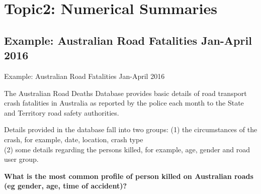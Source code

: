 \documentclass[t,xcolor=pdftex,dvipsnames,table]{beamer}\usepackage[]{graphicx}\usepackage[]{color}
\begin{document}
\section[2]{Topic2: Numerical Summaries}

\subsection[]{Example: Australian Road Fatalities Jan-April 2016}

\begin{frame}[fragile]{Example: Australian Road Fatalities Jan-April 2016}

The Australian Road Deaths Database provides basic details of road transport crash fatalities in Australia as reported by the police each month to the State and Territory road safety authorities.

\vspace{.5cm}
Details provided in the database fall into two groups:
(1) the circumstances of the crash, for example, date, location, crash type \\
(2) some details regarding the persons killed, for example, age, gender and road user group.

\vspace{.5cm}
{\bf What is the most common profile of person killed on Australian roads (eg gender, age, time of accident)?}

\vspace{.5cm}
\href{https://bitre.gov.au/statistics/safety/fatal_road_crash_database.aspx}{}
\end{frame}
\end{document}
